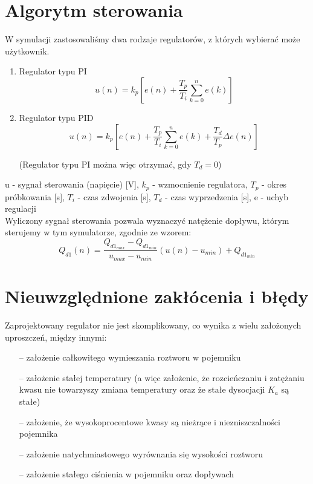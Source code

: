 \documentclass[polish,polish,a4paper,12pt]{article}
\begin{document}
	\section{Algorytm sterowania}
	W symulacji zastosowaliśmy dwa rodzaje regulatorów, z których wybierać może użytkownik.
	\begin{enumerate}
		\item Regulator typu PI
		\begin{equation*}
			u(n) = k_p\left[e(n) + \frac{T_p}{T_i}\sum_{k=0}^{n}e(k)\right]
		\end{equation*}
		\item Regulator typu PID
		\begin{equation*}
			u(n) = k_p\left[e(n) + \frac{T_p}{T_i}\sum_{k=0}^{n}e(k) + \frac{T_d}{T_p}\Delta e(n)\right]
		\end{equation*}
		\begin{center}
			\small(Regulator typu PI można więc otrzymać, gdy $T_d = 0$)
		\end{center}
	\end{enumerate}
	\small{u - sygnał sterowania (napięcie) [V], $k_p$ - wzmocnienie regulatora, $T_p$ - okres próbkowania [s], $T_i$ - czas zdwojenia [s], $T_d$ - czas wyprzedzenia [s], e - uchyb regulacji}\\
	Wyliczony sygnał sterowania pozwala wyznaczyć natężenie dopływu, którym sterujemy w tym symulatorze, zgodnie ze wzorem:
	\begin{equation*}
		Q_{d1}(n) = \frac{Q_{{d1}_{max}} - Q_{{d1}_{min}}}{u_{max} - u_{min}}\left(u(n) - u_{min}\right) + Q_{{d1}_{min}}
	\end{equation*}
	\section{Nieuwzględnione zakłócenia i błędy}
	Zaprojektowany regulator nie jest skomplikowany, co wynika z wielu założonych uproszczeń, między innymi:
	\begin{enumerate}
		\item [--] założenie całkowitego wymieszania roztworu w pojemniku
		\item [--] założenie stałej temperatury (a więc założenie, że rozcieńczaniu i zatężaniu kwasu nie towarzyszy zmiana temperatury oraz że stałe dysocjacji $K_a$ są stałe)
		\item [--] założenie, że wysokoprocentowe kwasy są nieżrące i niezniszczalności pojemnika
		\item [--] założenie natychmiastowego wyrównania się wysokości roztworu
		\item [--] założenie stałego ciśnienia w pojemniku oraz dopływach
	\end{enumerate}
\end{document}
